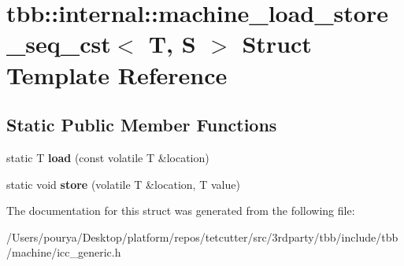 \hypertarget{structtbb_1_1internal_1_1machine__load__store__seq__cst}{}\section{tbb\+:\+:internal\+:\+:machine\+\_\+load\+\_\+store\+\_\+seq\+\_\+cst$<$ T, S $>$ Struct Template Reference}
\label{structtbb_1_1internal_1_1machine__load__store__seq__cst}
\subsection*{Static Public Member Functions}
\begin{DoxyCompactItemize}
\item 
\hypertarget{structtbb_1_1internal_1_1machine__load__store__seq__cst_adc2fafd722dce13da91cba5bcc29baaf}{}static T {\bfseries load} (const volatile T \&location)\label{structtbb_1_1internal_1_1machine__load__store__seq__cst_adc2fafd722dce13da91cba5bcc29baaf}

\item 
\hypertarget{structtbb_1_1internal_1_1machine__load__store__seq__cst_a490581dda59cc9a66c08edd0f66af710}{}static void {\bfseries store} (volatile T \&location, T value)\label{structtbb_1_1internal_1_1machine__load__store__seq__cst_a490581dda59cc9a66c08edd0f66af710}

\end{DoxyCompactItemize}


The documentation for this struct was generated from the following file\+:\begin{DoxyCompactItemize}
\item 
/\+Users/pourya/\+Desktop/platform/repos/tetcutter/src/3rdparty/tbb/include/tbb/machine/icc\+\_\+generic.\+h\end{DoxyCompactItemize}
